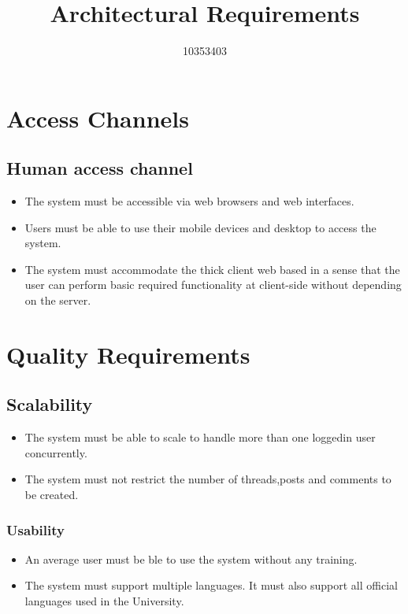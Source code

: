 \documentclass[11pt,a4paper]{article}
\begin{document}
\begin{titlepage}
\title{Architectural Requirements}
\author{10353403}
\maketitle
\end{titlepage}

\section{Access Channels}
	\subsection*{Human access channel}
		\begin{itemize}
			\item The system must be accessible via web browsers and web interfaces.
			\item Users must be able to use their mobile devices and desktop to access the system.
			\item The system must accommodate the thick client web based in a sense that the user can perform basic required functionality at client-side without depending on the server.
		\end{itemize}
\section{Quality Requirements}
	\subsection*{Scalability}
	\begin{itemize}
		\item The system must be able to scale to handle more than one loggedin user concurrently.
		\item The system must not restrict the number of threads,posts and comments to be created.
	\end{itemize}
	\subsubsection*{Usability}
	\begin{itemize}
		\item An average user must be ble to use the system without any training.
		\item The system must support multiple languages. It must also support all official languages used in the University.
	\end{itemize}
\end{document}
